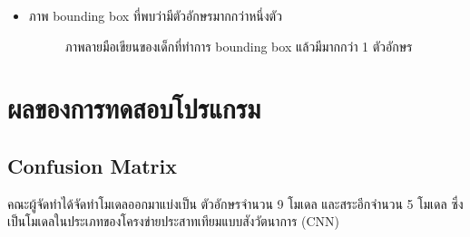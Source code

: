 \documentclass[12pt,oneside,openright,a4paper]{cpe-thai-project}
\begin{document}
\begin{itemize}
\begin{figure}[!h]
    \setlength{\fboxrule}{0.2mm} %
    \setlength{\fboxsep}{1cm}
    \caption{ภาพลายมือเขียนของเด็ก}\label{fig:system}                  
   \end{figure}
\par โดยในส่วนของภาพที่ระบบ OCR ไม่สามารถทำการแยกได้ถูกต้องนั้นเนื่องจากกรณีเช่นผู้เข้าร่วมทำแบบทดสอบทำการเขียนตัวอักษร หรือสระมาชนกันทำให้ระบบ OCR เข้าใจว่าเป็นเพียงตัวอักษรเดียวดังรูป \ref{fig:ocrpythonbox}
   \item ภาพ bounding box ที่พบว่ามีตัวอักษรมากกว่าหนึ่งตัว
  \begin{figure}[!h]\centering
    \setlength{\fboxrule}{0.2mm} %
    \setlength{\fboxsep}{1cm}
    \caption{ภาพลายมือเขียนของเด็กที่ทำการ bounding box แล้วมีมากกว่า 1 ตัวอักษร}\label{fig:ocrpythonbox}                  
   \end{figure}
\end{itemize}
\newpage
\section{ผลของการทดสอบโปรแกรม}

\subsection{Confusion Matrix}
คณะผู้จัดทำได้จัดทำโมเดลออกมาแบ่งเป็น ตัวอักษรจำนวน 9 โมเดล และสระอีกจำนวน 5 โมเดล ซึ่งเป็นโมเดลในประเภทของโครงข่ายประสาทเทียมแบบสังวัตนาการ (CNN)
\end{document}
